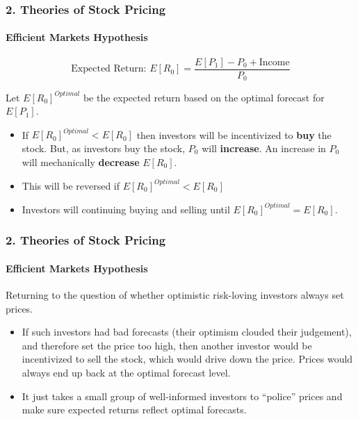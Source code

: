 \documentclass{beamer}
\begin{document}
\begin{frame}[t]
    \frametitle{2. Theories of Stock Pricing}
    \framesubtitle{Efficient Markets Hypothesis}

    $$
    \text{Expected Return:  } E[R_0] = \frac{E[P_1] - P_0 +\text{Income}}{P_0}
    $$

    Let $E[R_0]^{Optimal}$ be the expected return based on the optimal forecast for $E[P_1]$.
    \vspace{1em}
    \begin{itemize}
        \item If $E[R_0]^{Optimal} < E[R_0]$ then investors will be incentivized to \textbf{buy} the stock.   But, as investors buy the stock, $P_0$ will \textbf{increase}.  An increase in $P_0$ will mechanically \textbf{decrease} $E[R_0]$.
        \item This will be reversed if $E[R_0]^{Optimal} < E[R_0]$
        \item Investors will continuing buying and selling until $E[R_0]^{Optimal} = E[R_0]$.  
    \end{itemize}

\end{frame}

\begin{frame}[t]
    \frametitle{2. Theories of Stock Pricing}
    \framesubtitle{Efficient Markets Hypothesis}

    Returning to the question of whether optimistic risk-loving investors always set prices.
    \begin{itemize}
        \item If such investors had bad forecasts (their optimism clouded their judgement), and therefore set the price too high, then another investor would be incentivized to sell the stock, which would drive down the price.  Prices would always end up back at the optimal forecast level.
        \item It just takes a small group of well-informed investors to “police” prices and make sure expected returns reflect optimal forecasts.
    \end{itemize}

\end{frame}
\end{document}
